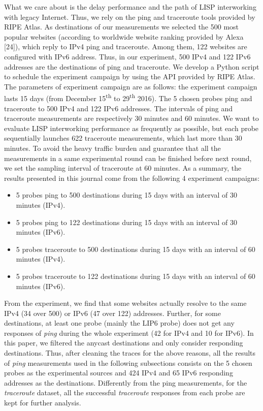 What we care about is the delay performance and the path of LISP interworking with legacy Internet. Thus, we rely on the ping and traceroute tools provided by RIPE Atlas. As destinations of our measurements we selected the 500 most popular websites (according to worldwide website ranking provided by Alexa [24]), which reply to IPv4 ping and traceroute. Among them, 122 websites are configured with IPv6 address. Thus, in our experiment, 500 IPv4 and 122 IPv6 addresses are the destinations of ping and traceroute. We develop a Python script to schedule the experiment campaign by using the API provided by RIPE Atlas. The parameters of experiment campaign are as follows: the experiment campaign lasts 15 days (from December 15\textsuperscript{th} to 29\textsuperscript{th} 2016). The 5 chosen probes ping and traceroute to 500 IPv4 and 122 IPv6 addresses. The intervals of ping and traceroute measurements are respectively 30 minutes and 60 minutes. We want to evaluate LISP interworking performance as frequently as possible, but each probe sequentially launches 622 traceroute measurements, which last more than 30 minutes. To avoid the heavy traffic burden and guarantee that all the measurements in a same experimental round can be finished before next round, we set the sampling interval of traceroute at 60 minutes. As a summary, the results presented in this journal come from the following 4 experiment campaigns:
\begin{itemize}[noitemsep,topsep=0pt]
	\item 5 probes ping to 500 destinations during 15 days with an interval of 30 minutes (IPv4).
	\item 5 probes ping to 122 destinations during 15 days with an interval of 30 minutes (IPv6).
	\item 5 probes traceroute to 500 destinations during 15 days with an interval of 60 minutes (IPv4).
	\item 5 probes traceroute to 122 destinations during 15 days with an interval of 60 minutes (IPv6).
\end{itemize}

From the experiment, we find that some websites actually resolve to the same IPv4 (34 over 500) or IPv6 (47 over 122) addresses. Further, for some destinations, at least one probe (mainly the LIP6 probe) does not get any responses of \emph{ping} during the whole experiment (42 for IPv4 and 10 for IPv6). In this paper, we filtered the anycast destinations and only consider responding destinations. Thus, after cleaning the traces for the above reasons, all the results of \emph{ping} measurements used in the following subsections consists on the 5 chosen probes as the experimental sources and 424 IPv4 and 65 IPv6 responding addresses as the destinations. Differently from the ping measurements, for the \emph{traceroute} dataset, all the successful \emph{traceroute} responses from each probe are kept for further analysis.


